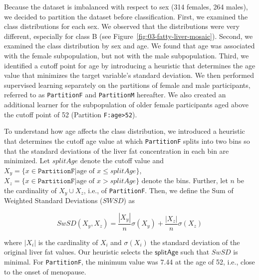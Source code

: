 \documentclass[
  oneside]{book}
\begin{document}
Because the dataset is imbalanced with respect to sex (314 females, 264 males), we decided to partition the dataset before classification.
First, we examined the class distributions for each sex.
We observed that the distributions were very different, especially for class B (see Figure~\ref{fig:03-fatty-liver-mosaic}).
Second, we examined the class distribution by sex and age.
We found that age was associated with the female subpopulation, but not with the male subpopulation.
Third, we identified a cutoff point for age by introducing a heuristic that determines the age value that minimizes the target variable's standard deviation.
We then performed supervised learning separately on the partitions of female and male participants, referred to as \texttt{PartitionF} and \texttt{PartitionM} hereafter.
We also created an additional learner for the subpopulation of older female participants aged above the cutoff point of 52 (Partition \texttt{F:age\textgreater{}52}).

To understand how age affects the class distribution, we introduced a heuristic that determines the cutoff age value at which \texttt{PartitionF} splits into two bins so that the standard deviations of the liver fat concentration in each bin are minimized.
Let \(splitAge\) denote the cutoff value and \(X_y=\{x\in\mathtt{PartitionF}|\text{age of } x \leq splitAge\}\), \(X_z=\{x\in\mathtt{PartitionF}|\text{age of } x > splitAge\}\) denote the bins.
Further, let \(n\) be the cardinality of \(X_y\cup{}X_z\), i.e., of \texttt{PartitionF}.
Then, we define the Sum of Weighted Standard Deviations (\(SWSD\)) as

\begin{equation}
SwSD\left(X_y,X_z\right) = \frac{|X_y|}{n}\sigma({X_y})+\frac{|X_z|}{n}\sigma({X_z})
\label{eq:03-swsd}
\end{equation}

where \(|X_i|\) is the cardinality of \(X_i\) and \(\sigma(X_i)\) the standard deviation of the original liver fat values.
Our heuristic selects the \(\mathsf{splitAge}\) such that \(SwSD\) is minimal.
For \texttt{PartitionF}, the minimum value was 7.44 at the age of 52, i.e., close to the onset of menopause.
\end{document}
